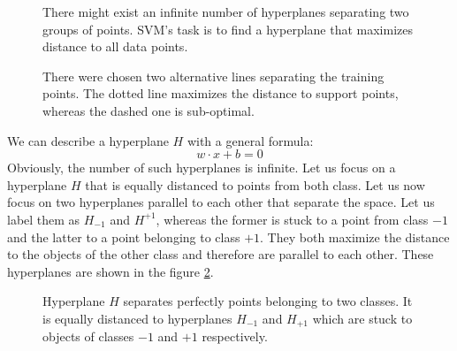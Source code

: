 \begin{figure}[t!]
\centering
\begin{minipage}[t!]{0.45\linewidth}
  
  \caption{There might exist an infinite number of hyperplanes separating two groups of points. SVM's task is to find a hyperplane that maximizes distance to all data points.}
  \label{fig:inf_hyperplanes}
\end{minipage}
\quad
\begin{minipage}[t!]{0.45\linewidth}
  
  \caption{There were chosen two alternative lines separating the training points. The dotted line maximizes the distance to support points, whereas the dashed one is sub-optimal.}
  \label{fig:optimal_and_suboptimal}
\end{minipage}
\end{figure}

We can describe a hyperplane $H$ with a general formula:
\begin{equation}
w \cdot x+b = 0
\end{equation}
Obviously, the number of such hyperplanes is infinite. Let us focus on a hyperplane $H$ that is equally distanced to points from both class. Let us now focus on two hyperplanes parallel to each other that separate the space. Let us label them as $H_{-1}$ and $H^{+1}$, whereas the former is stuck to a point from class $-1$ and the latter to a point belonging to class $+1$. They both maximize the distance to the objects of the other class and therefore are parallel to each other. These hyperplanes are shown in the figure \ref{fig:two_hyperplanes}.

\begin{figure}[htbp]
  \centering
  
  \caption{Hyperplane $H$ separates perfectly points belonging to two classes. It is equally distanced to hyperplanes $H_{-1}$ and $H_{+1}$ which are stuck to objects of classes $-1$ and $+1$ respectively.}
  \label{fig:two_hyperplanes}
\end{figure}



